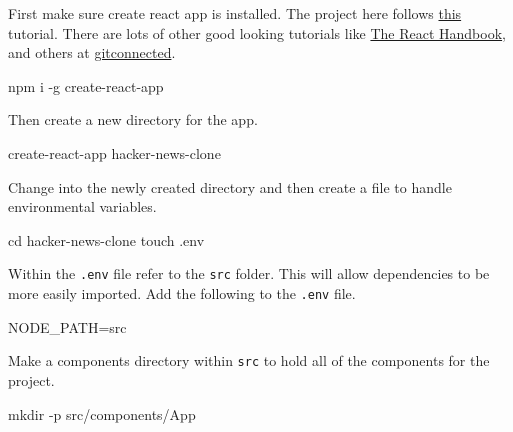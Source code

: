 \documentclass[]{book}
\newenvironment{Shaded}{\begin{snugshade}}{\end{snugshade}}
\newcommand{\BuiltInTok}[1]{#1}
\newcommand{\ExtensionTok}[1]{#1}
\newcommand{\FunctionTok}[1]{\textcolor[rgb]{0.00,0.00,0.00}{#1}}
\newcommand{\NormalTok}[1]{#1}
\newcommand{\VariableTok}[1]{\textcolor[rgb]{0.00,0.00,0.00}{#1}}
\begin{document}
First make sure create react app is installed. The project here follows \href{https://www.youtube.com/watch?v=oGB_VPrld0U\&list=PLTTC1K14KAxHj6AftnRUD28SQaoVauvl3}{this} tutorial. There are lots of other good looking tutorials like \href{https://www.freecodecamp.org/news/the-react-handbook-b71c27b0a795/}{The React Handbook}, and others at \href{https://gitconnected.com/learn/react}{gitconnected}.

\begin{Shaded}
\begin{Highlighting}[]
\ExtensionTok{npm}\NormalTok{ i -g create-react-app}
\end{Highlighting}
\end{Shaded}

Then create a new directory for the app.

\begin{Shaded}
\begin{Highlighting}[]
\ExtensionTok{create-react-app}\NormalTok{ hacker-news-clone}
\end{Highlighting}
\end{Shaded}

Change into the newly created directory and then create a file to handle environmental variables.

\begin{Shaded}
\begin{Highlighting}[]
\BuiltInTok{cd}\NormalTok{ hacker-news-clone}
\FunctionTok{touch}\NormalTok{ .env}
\end{Highlighting}
\end{Shaded}

Within the \texttt{.env} file refer to the \texttt{src} folder. This will allow dependencies to be more easily imported.
Add the following to the \texttt{.env} file.

\begin{Shaded}
\begin{Highlighting}[]
\VariableTok{NODE_PATH=}\NormalTok{src}
\end{Highlighting}
\end{Shaded}

Make a components directory within \texttt{src} to hold all of the components for the project.

\begin{Shaded}
\begin{Highlighting}[]
\FunctionTok{mkdir}\NormalTok{ -p src/components/App}
\end{Highlighting}
\end{Shaded}
\end{document}
